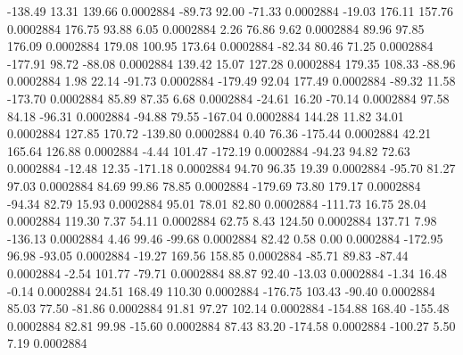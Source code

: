      -138.49       13.31      139.66     0.0002884
      -89.73       92.00      -71.33     0.0002884
      -19.03      176.11      157.76     0.0002884
      176.75       93.88        6.05     0.0002884
        2.26       76.86        9.62     0.0002884
       89.96       97.85      176.09     0.0002884
      179.08      100.95      173.64     0.0002884
      -82.34       80.46       71.25     0.0002884
     -177.91       98.72      -88.08     0.0002884
      139.42       15.07      127.28     0.0002884
      179.35      108.33      -88.96     0.0002884
        1.98       22.14      -91.73     0.0002884
     -179.49       92.04      177.49     0.0002884
      -89.32       11.58     -173.70     0.0002884
       85.89       87.35        6.68     0.0002884
      -24.61       16.20      -70.14     0.0002884
       97.58       84.18      -96.31     0.0002884
      -94.88       79.55     -167.04     0.0002884
      144.28       11.82       34.01     0.0002884
      127.85      170.72     -139.80     0.0002884
        0.40       76.36     -175.44     0.0002884
       42.21      165.64      126.88     0.0002884
       -4.44      101.47     -172.19     0.0002884
      -94.23       94.82       72.63     0.0002884
      -12.48       12.35     -171.18     0.0002884
       94.70       96.35       19.39     0.0002884
      -95.70       81.27       97.03     0.0002884
       84.69       99.86       78.85     0.0002884
     -179.69       73.80      179.17     0.0002884
      -94.34       82.79       15.93     0.0002884
       95.01       78.01       82.80     0.0002884
     -111.73       16.75       28.04     0.0002884
      119.30        7.37       54.11     0.0002884
       62.75        8.43      124.50     0.0002884
      137.71        7.98     -136.13     0.0002884
        4.46       99.46      -99.68     0.0002884
       82.42        0.58        0.00     0.0002884
     -172.95       96.98      -93.05     0.0002884
      -19.27      169.56      158.85     0.0002884
      -85.71       89.83      -87.44     0.0002884
       -2.54      101.77      -79.71     0.0002884
       88.87       92.40      -13.03     0.0002884
       -1.34       16.48       -0.14     0.0002884
       24.51      168.49      110.30     0.0002884
     -176.75      103.43      -90.40     0.0002884
       85.03       77.50      -81.86     0.0002884
       91.81       97.27      102.14     0.0002884
     -154.88      168.40     -155.48     0.0002884
       82.81       99.98      -15.60     0.0002884
       87.43       83.20     -174.58     0.0002884
     -100.27        5.50        7.19     0.0002884
